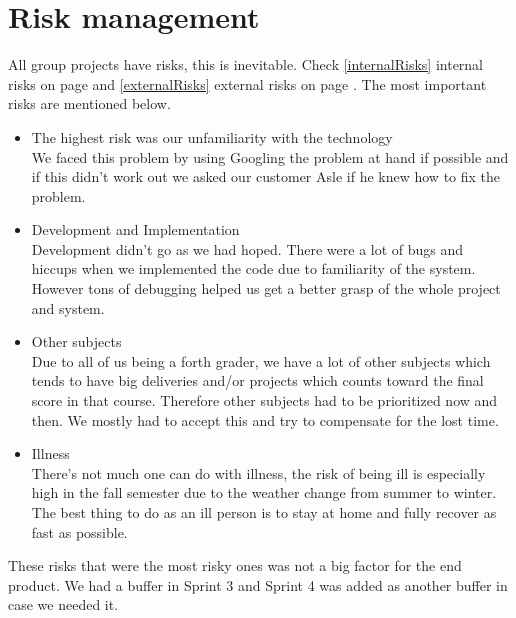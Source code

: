 \section{Risk management}

All group projects have risks, this is inevitable. Check \ref{internalRisks} internal risks on page \pageref{internalRisks} and \ref{externalRisks} external risks on page \pageref{externalRisks}. The most important risks are mentioned below.

\begin{itemize}
\item The highest risk was our unfamiliarity with the technology \\ We faced this problem by using Googling the problem at hand if possible and if this didn't work out we asked our customer Asle if he knew how to fix the problem.
\item Development and Implementation \\ Development didn't go as we had hoped. There were a lot of bugs and hiccups when we implemented the code due to familiarity of the system. However tons of debugging helped us get a better grasp of the whole project and system.
\item Other subjects \\Due to all of us being a forth grader, we have a lot of other subjects which tends to have big deliveries and/or projects which counts toward the final score in that course. Therefore other subjects had to be prioritized now and then. We mostly had to accept this and try to compensate for the lost time.
\item Illness \\ There's not much one can do with illness, the risk of being ill is especially high in the fall semester due to the weather change from summer to winter. The best thing to do as an ill person is to stay at home and fully recover as fast as possible. 
\end{itemize}
These risks that were the most risky ones was not a big factor for the end product. We had a buffer in Sprint 3 and Sprint 4 was added as another buffer in case we needed it.



